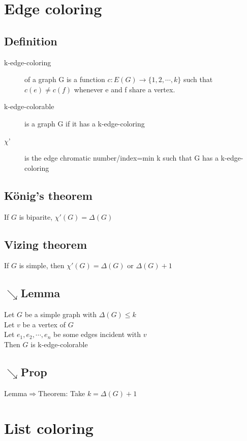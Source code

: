     \section{Edge coloring}
        \subsection{Definition}
            \begin{description}
                \item[k-edge-coloring] of a graph G is a function $c:E(G)\rightarrow \{1, 2, \cdots, k\}$ such that $c(e)\neq c(f)$ whenever e and f share a vertex.
                \item[k-edge-colorable] is a graph G if it has a k-edge-coloring
                \item[$\chi$'] is the edge chromatic number/index=min k such that G has a k-edge-coloring
            \end{description}
        \subsection{König's theorem}
            If $G$ is biparite, $\chi'(G)=\Delta(G)$
        \subsection{Vizing theorem}
            If $G$ is simple, then $\chi'(G)=\Delta(G)\text{ or }\Delta(G)+1$
        \subsection{$\searrow$Lemma}
            Let $G$ be a simple graph with $\Delta(G)\leq k$\\
            Let $v$ be a vertex of $G$\\
            Let $e_1, e_2, \cdots, e_n$ be some edges incident with $v$\\
            Then $G$ is k-edge-colorable
        \subsection{$\searrow$Prop}
            Lemma$\Rightarrow$Theorem: Take $k=\Delta(G)+1$
    \section{List coloring}
